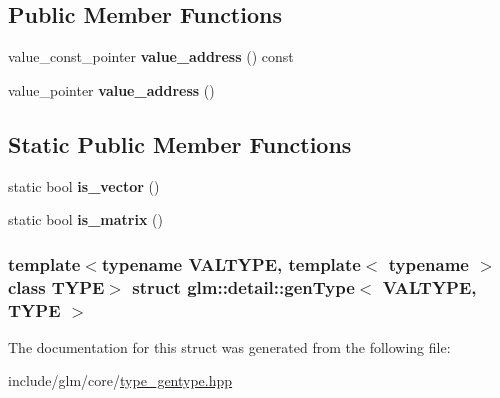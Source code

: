 \subsection*{\-Public \-Member \-Functions}
\begin{DoxyCompactItemize}
\item 
\hypertarget{structglm_1_1detail_1_1genType_a63fb77e77082f34c0a0d7faa0906f7f4}{value\-\_\-const\-\_\-pointer {\bfseries value\-\_\-address} () const }\label{structglm_1_1detail_1_1genType_a63fb77e77082f34c0a0d7faa0906f7f4}

\item 
\hypertarget{structglm_1_1detail_1_1genType_a146973ec142766743080c1895a9e3c65}{value\-\_\-pointer {\bfseries value\-\_\-address} ()}\label{structglm_1_1detail_1_1genType_a146973ec142766743080c1895a9e3c65}

\end{DoxyCompactItemize}
\subsection*{\-Static \-Public \-Member \-Functions}
\begin{DoxyCompactItemize}
\item 
\hypertarget{structglm_1_1detail_1_1genType_ae83087df55201bdc46a37decf3d1c34c}{static bool {\bfseries is\-\_\-vector} ()}\label{structglm_1_1detail_1_1genType_ae83087df55201bdc46a37decf3d1c34c}

\item 
\hypertarget{structglm_1_1detail_1_1genType_a78c650375558d5e2ccfba383cdb59479}{static bool {\bfseries is\-\_\-matrix} ()}\label{structglm_1_1detail_1_1genType_a78c650375558d5e2ccfba383cdb59479}

\end{DoxyCompactItemize}
\subsubsection*{template$<$typename V\-A\-L\-T\-Y\-P\-E, template$<$ typename $>$ class \-T\-Y\-P\-E$>$ struct glm\-::detail\-::gen\-Type$<$ V\-A\-L\-T\-Y\-P\-E, T\-Y\-P\-E $>$}



\-The documentation for this struct was generated from the following file\-:\begin{DoxyCompactItemize}
\item 
include/glm/core/\hyperlink{type__gentype_8hpp}{type\-\_\-gentype.\-hpp}\end{DoxyCompactItemize}
